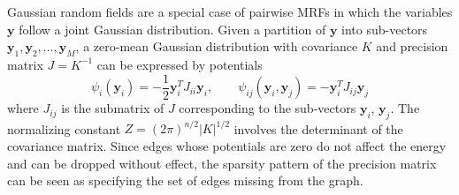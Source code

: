 \documentclass{article}
\renewcommand{\v}[1]{\mathbf{#1}}
\begin{document}
Gaussian random fields are a special case of pairwise MRFs in which
the variables $\v{y}$ follow a joint Gaussian distribution. Given a partition of
$\v{y}$ into sub-vectors $\v{y}_1, \v{y}_2, \ldots, \v{y}_M$, a
zero-mean Gaussian distribution with covariance $K$ and precision
matrix $J = K^{-1}$ can
be expressed by potentials 
\begin{equation}
\psi_i(\v{y}_i) = -\frac{1}{2}\v{y}_i^T
J_{ii} \v{y}_i, \qquad\psi_{ij}(\v{y}_i, \v{y}_j) = -\v{y}_i^T J_{ij}
\v{y}_j \label{eqn:gaussian-mrf}
\end{equation} where $J_{ij}$ is the submatrix of $J$ corresponding
to the sub-vectors $\v{y}_i$, $\v{y}_j$. The
normalizing constant $Z =
(2\pi)^{n/2}|K|^{1/2}$ involves the determinant of the covariance
matrix. Since edges whose potentials are zero do not affect the energy
and can be dropped without effect, the sparsity pattern of the
precision matrix can be seen as specifying the set of edges missing
from the graph. 











\end{document}
